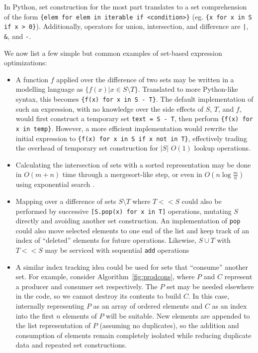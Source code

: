 \documentclass{article}
\begin{document}
In Python, set construction for the most part translates to a set comprehension of the form \texttt{\{elem for elem in iterable if <condition>\}} (eg. \texttt{\{x for x in S if x > 0\}}). Additionally, operators for union, intersection, and difference are \texttt{|}, \texttt{\&}, and \texttt{-}.

We now list a few simple but common examples of set-based expression optimizations:
\begin{itemize}
  \item A function $f$ applied over the difference of two sets may be written in a modelling language as $\{f(x) | x \in S \setminus T\}$. Translated to more Python-like syntax, this becomes \texttt{\{f(x) for x in S - T\}}. The default implementation of such an expression, with no knowledge over the side effects of $S$, $T$, and $f$, would first construct a temporary set \texttt{text = S - T}, then perform \texttt{\{f(x) for x in temp\}}. However, a more efficient implementation would rewrite the initial expression to \texttt{\{f(x) for x in S if x not in T\}}, effectively trading the overhead of temporary set construction for $|S|$ $O(1)$ lookup operations.
  \item Calculating the intersection of sets with a sorted representation may be done in $O(m+n)$ time through a mergesort-like step, or even in $O(n\log{\frac{m}{n}})$ using exponential search \cite{sortedIntersectionStackOverflow}.
  \item Mapping over a difference of sets $S \setminus T$ where $T << S$ could also be performed by successive \texttt{[S.pop(x) for x in T]} operations, mutating $S$ directly and avoiding another set construction. An implementation of \texttt{pop} could also move selected elements to one end of the list and keep track of an index of ``deleted'' elements for future operations. Likewise, $S \cup T$ with $T << S$ may be serviced with sequential \texttt{add} operations
  \item A similar index tracking idea could be used for sets that ``consume'' another set. For example, consider Algorithm~\ref{fig:prodcons}, where $P$ and $C$ represent a producer and consumer set respectively. The $P$ set may be needed elsewhere in the code, so we cannot destroy its contents to build $C$. In this case, internally representing $P$ as an array of ordered elements and $C$ as an index into the first $n$ elements of $P$ will be suitable. New elements are appended to the list representation of $P$ (assuming no duplicates), so the addition and consumption of elements remain completely isolated while reducing duplicate data and repeated set constructions.
\end{itemize}
\end{document}
